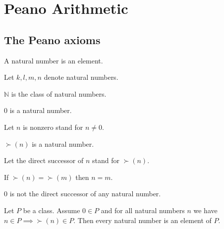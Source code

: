 \documentclass[../../natural-numbers.ftl.tex]{subfiles}
\begin{document}
  \section{Peano Arithmetic}

  \begin{forthel}
  \end{forthel}

  \begin{forthel}
  \end{forthel}


  \subsection{The Peano axioms}

  \begin{forthel}
    \begin{signature}
      A natural number is an element.
    \end{signature}

    Let $k,l,m,n$ denote natural numbers.

    \begin{definition}
      $\mathbb{N}$ is the class of natural numbers.
    \end{definition}

    \begin{signature}
      $0$ is a natural number.
    \end{signature}

    Let $n$ is nonzero stand for $n \neq 0$.

    \begin{signature}
      $\succ(n)$ is a natural number.
    \end{signature}

    Let the direct successor of $n$ stand for $\succ(n)$.

    \begin{axiom}
      If $\succ(n) = \succ(m)$ then $n = m$.
    \end{axiom}

    \begin{axiom}
      $0$ is not the direct successor of any natural number.
    \end{axiom}

    \begin{axiom}
      Let $P$ be a class.
      Assume $0 \in P$ and for all natural numbers $n$ we have $n \in P \implies \succ(n) \in P$.
      Then every natural number is an element of $P$.
    \end{axiom}
  \end{forthel}
\end{document}
